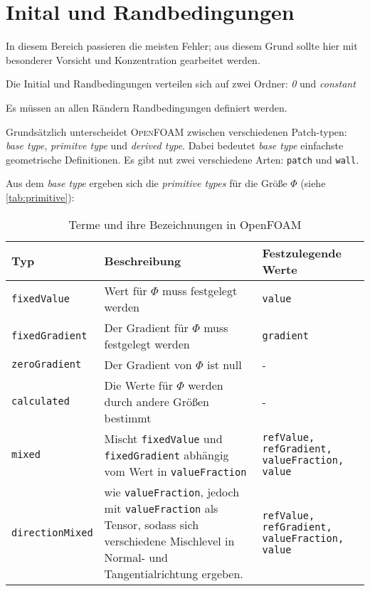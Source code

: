 \chapter{Inital und Randbedingungen}

In diesem Bereich passieren die meisten Fehler; aus diesem Grund sollte hier mit besonderer Vorsicht und Konzentration gearbeitet werden.

Die Initial und Randbedingungen verteilen sich auf zwei Ordner: \textit{0} und \textit{constant}

Es müssen an allen Rändern Randbedingungen definiert werden.

Grundsätzlich unterscheidet \textsc{OpenFOAM} zwischen verschiedenen Patch-typen: \textit{base type}, \textit{primitve type} und \textit{derived type}. Dabei bedeutet \textit{base type} einfachste geometrische Definitionen. Es gibt nut zwei verschiedene Arten: \texttt{patch} und \texttt{wall}.

Aus dem \textit{base type} ergeben sich die \textit{primitive types} für die Größe $ \Phi $ (siehe \autoref{tab:primitive}): 
	
	\begin{table}[htb]
	  \centering
	  \begin{tabular}{m{2.5cm}m{6cm}m{3cm}} 
	  \toprule
	    	Typ & Beschreibung & Festzulegende Werte \\
	  \midrule
			\texttt{fixedValue} & Wert für $ \Phi $ muss festgelegt werden & \texttt{value} \\
			\texttt{fixedGradient} & Der Gradient für $ \Phi $ muss festgelegt werden & \texttt{gradient} \\
			\texttt{zeroGradient} & Der Gradient von $ \Phi $ ist null & - \\
			\texttt{calculated} & Die Werte für $ \Phi $ werden durch andere Größen bestimmt & - \\
			\texttt{mixed} & Mischt \texttt{fixedValue} und \texttt{fixedGradient} abhängig vom Wert in 	\texttt{valueFraction} & \texttt{refValue, refGradient, valueFraction, value} \\
			\texttt{directionMixed} & wie \texttt{valueFraction}, jedoch mit \texttt{valueFraction} als Tensor, sodass sich verschiedene Mischlevel in Normal- und Tangentialrichtung ergeben. & \texttt{refValue, refGradient, valueFraction, value} \\
	  \bottomrule
	  
	  \end{tabular}
	  \caption[Terme und ihre Bezeichnungen in OpenFOAM]{Terme und ihre Bezeichnungen in OpenFOAM}
	  \label{tab:primitive}
	\end{table} 

